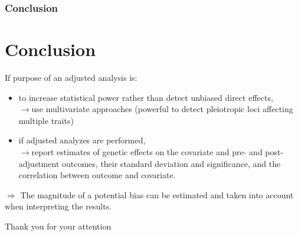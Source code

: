 \documentclass{beamer}
\begin{document}
\begin{frame}
\frametitle{Conclusion}
\section{Conclusion}
\begin{block}{}


If purpose of an adjusted analysis is:

\begin{itemize}
\item to increase statistical power rather than detect unbiased direct effects,\\
 $\rightarrow$use multivariate approaches (powerful to detect pleiotropic loci affecting multiple traits)
\item if adjusted analyzes are performed,\\
 $\rightarrow$report estimates of genetic effects on the covariate and pre- and post-adjustment outcomes, their standard deviation and significance, and the correlation between outcome and covariate. 
\end{itemize}
 $\Rightarrow$ The magnitude of a potential bias can be estimated and taken into account when interpreting the results.
\end{block}
\end{frame}



\begin{frame}
\Huge{\centerline{Thank you for your attention}}
\end{frame}

\end{document}
